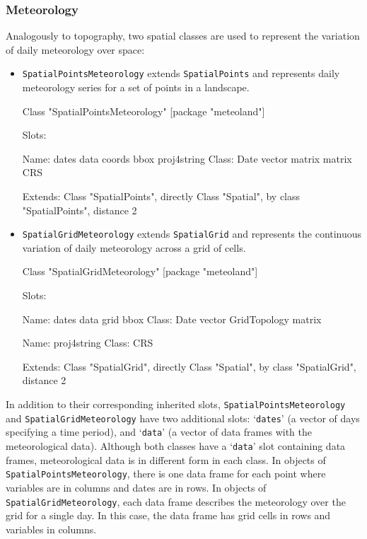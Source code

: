 \documentclass[11pt,a4paper]{article}
\begin{document}
\subsubsection{Meteorology}
Analogously to topography, two spatial classes are used to represent the variation of daily meteorology over space:
\begin{itemize}
\item{\texttt{SpatialPointsMeteorology} extends \texttt{SpatialPoints} and represents daily meteorology series for a set of points in a landscape.
\begin{Schunk}
\begin{Soutput}
Class "SpatialPointsMeteorology" [package "meteoland"]

Slots:
                                                                  
Name:        dates        data      coords        bbox proj4string
Class:        Date      vector      matrix      matrix         CRS

Extends: 
Class "SpatialPoints", directly
Class "Spatial", by class "SpatialPoints", distance 2
\end{Soutput}
\end{Schunk}
}
\item{\texttt{SpatialGridMeteorology} extends \texttt{SpatialGrid} and represents the continuous variation of daily meteorology across a grid of cells.
\begin{Schunk}
\begin{Soutput}
Class "SpatialGridMeteorology" [package "meteoland"]

Slots:
                                                          
Name:         dates         data         grid         bbox
Class:         Date       vector GridTopology       matrix
                   
Name:   proj4string
Class:          CRS

Extends: 
Class "SpatialGrid", directly
Class "Spatial", by class "SpatialGrid", distance 2
\end{Soutput}
\end{Schunk}
}
\end{itemize}
In addition to their corresponding inherited slots, \texttt{SpatialPointsMeteorology} and \texttt{SpatialGridMeteorology} have two additional slots: `\texttt{dates}' (a vector of days specifying a time period), and `\texttt{data}' (a vector of data frames with the meteorological data).
Although both classes have a `\texttt{data}' slot containing data frames, meteorological data is in different form in each class. In objects of \texttt{SpatialPointsMeteorology}, there is one data frame for each point where variables are in columns and dates are in rows. In objects of \texttt{SpatialGridMeteorology}, each data frame describes the meteorology over the grid for a single day. In this case, the data frame has grid cells in rows and variables in columns.
\end{document}

